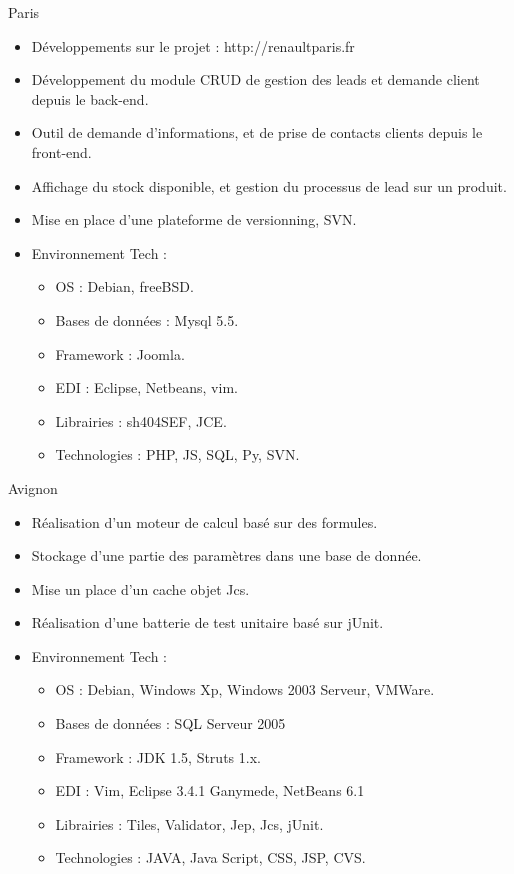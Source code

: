 \documentclass[10pt,a4paper,sans]{moderncv}
\begin{document}
{Paris}{
    \begin{itemize}%
        \item Développements sur le projet : http://renaultparis.fr
        \item Développement du module CRUD de gestion des leads et demande client depuis le back-end.
        \item Outil de demande d'informations, et de prise de contacts clients depuis le front-end.
        \item Affichage du stock disponible, et gestion du processus de lead sur un produit.
        \item Mise en place d'une plateforme de versionning, SVN.
        \item Environnement Tech :
            \begin{itemize}%
                \item OS : Debian, freeBSD.
                \item Bases de données : Mysql 5.5.
                \item Framework : Joomla.
                \item EDI : Eclipse, Netbeans, vim.
                \item Librairies : sh404SEF, JCE.
                \item Technologies : PHP, JS, SQL, Py, SVN.
            \end{itemize}
\end{itemize}}

{Avignon}{
    \begin{itemize}%
        \item Réalisation d'un moteur de calcul basé sur des formules.
        \item Stockage d'une partie des paramètres dans une base de donnée.
        \item Mise un place d'un cache objet Jcs.
        \item Réalisation d'une batterie de test unitaire basé sur jUnit.
        \item Environnement Tech :
            \begin{itemize}%
                \item OS : Debian, Windows Xp, Windows 2003 Serveur, VMWare.
                \item Bases de données : SQL Serveur 2005
                \item Framework : JDK 1.5,  Struts 1.x.
                \item EDI : Vim, Eclipse 3.4.1 Ganymede, NetBeans 6.1
                \item Librairies : Tiles, Validator, Jep, Jcs, jUnit.
                \item Technologies : JAVA, Java Script, CSS, JSP, CVS.
            \end{itemize}
\end{itemize}}
\end{document}
